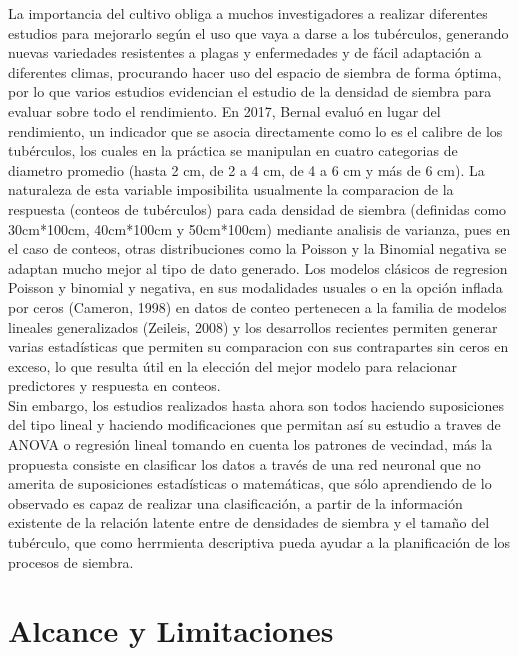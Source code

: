  La importancia del cultivo obliga a muchos investigadores a realizar diferentes estudios para mejorarlo según el uso que vaya a darse a los tubérculos, generando nuevas variedades resistentes a plagas y enfermedades y de fácil adaptación a diferentes climas, procurando hacer uso del espacio de siembra de forma óptima, por lo que varios estudios evidencian el estudio de la densidad de siembra para evaluar sobre todo el rendimiento. En 2017, Bernal evaluó en lugar del rendimiento, un indicador que se asocia directamente como lo es el calibre de los tubérculos, los cuales en la práctica se manipulan en cuatro categorias de diametro promedio (hasta 2 cm, de 2 a 4 cm, de 4 a 6 cm y más de 6 cm). La naturaleza de esta variable imposibilita usualmente la comparacion de la respuesta (conteos de tubérculos) para cada densidad de siembra (definidas como 30cm*100cm, 40cm*100cm y 50cm*100cm) mediante analisis de varianza, pues en el caso de conteos, otras distribuciones como la Poisson y la Binomial negativa se adaptan mucho mejor al tipo de dato generado. Los modelos clásicos de regresion Poisson y binomial y negativa, en sus modalidades usuales o en la opción inflada por ceros (Cameron, 1998) en datos de conteo pertenecen a la familia de modelos lineales generalizados (Zeileis, 2008) y los desarrollos recientes permiten generar varias estadísticas que permiten su comparacion con sus contrapartes sin ceros en exceso, lo que resulta útil en la elección del mejor modelo para relacionar predictores y respuesta en conteos.\\

Sin embargo, los estudios realizados hasta ahora son todos haciendo suposiciones del tipo lineal y haciendo modificaciones que permitan así su estudio a traves de ANOVA o regresión lineal tomando en cuenta los patrones de vecindad, más la propuesta consiste en clasificar los datos a través de una red neuronal que no amerita de suposiciones estadísticas o matemáticas, que sólo aprendiendo de lo observado es capaz de realizar una clasificación, a partir de la información existente de la relaci\'on latente entre de densidades de siembra y el tamaño del tubérculo, que como herrmienta descriptiva pueda ayudar  a la planificaci\'on de los procesos de siembra.\\



\section{Alcance y Limitaciones}

